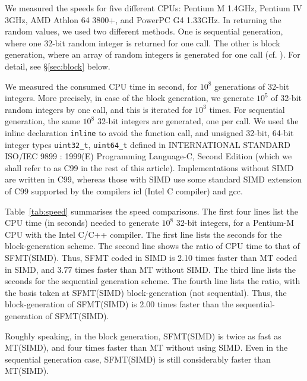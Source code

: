 \documentclass{svmult}
\begin{document}
We measured the speeds for five different CPUs:
Pentium M 1.4GHz, Pentium IV 3GHz, 
AMD Athlon 64 3800+, and PowerPC G4 1.33GHz.  
In returning the random values, we used two different methods.
One is sequential generation, where one 32-bit random 
integer is returned for one call. 
The other is block generation, where an array
of random integers is generated for one call 
(cf. \cite{knuth:bible}). 
For detail, see \S\ref{sec:block} below. 

We measured the consumed CPU time in second, 
for $10^8$ generations of 32-bit integers. More precisely,
in case of the block generation, we generate $10^5$
of 32-bit random integers by one call, and this is iterated
for $10^3$ times. 
For sequential generation, the same $10^8$
 32-bit integers are generated, one per call.
We used the inline declaration
{\tt inline} to avoid the function call,
and unsigned 32-bit, 64-bit integer types 
{\tt uint32\_t}, {\tt uint64\_t} defined in 
INTERNATIONAL STANDARD ISO/IEC 9899 : 1999(E) 
Programming Language-C, Second Edition
(which we shall refer to as C99 in the rest of this article).
Implementations without SIMD are written in C99,
whereas those with SIMD use
some standard SIMD extension of C99 supported by 
the compilers icl (Intel C compiler) and gcc.

Table~\ref{tab:speed} summarises the speed comparisons.
 The first four lines list the CPU time
(in seconds) needed to generate $10^8$ 
32-bit integers, for a Pentium-M CPU with the Intel C/C++
compiler. The first line lists the seconds for the
block-generation scheme. The second line shows the 
ratio of CPU time to that of 
SFMT(SIMD). Thus, SFMT coded in SIMD is 2.10 times
faster than MT coded in SIMD, and 3.77 times faster
than MT without SIMD. The third line lists the seconds
for the sequential generation scheme. The fourth line
lists the ratio, with the basis taken
at SFMT(SIMD) block-generation (not sequential). 
Thus, the block-generation of SFMT(SIMD) is 2.00 times
faster than the sequential-generation of SFMT(SIMD).

Roughly speaking, in the block generation, 
SFMT(SIMD) is twice as fast as MT(SIMD),
and four times faster than MT without using SIMD.
Even in the sequential generation case,
SFMT(SIMD) is still considerably faster than MT(SIMD).
\end{document}
